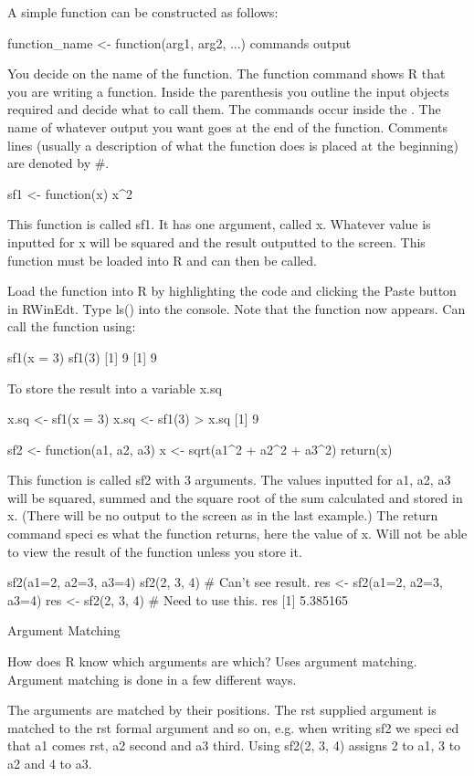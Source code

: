 A simple function can be constructed as follows:

 
function_name <- function(arg1, arg2, ...){
commands
output
}

 
You decide on the name of the function.
The function command shows R that you are writing a function.
Inside the parenthesis you outline the input objects required and decide what to call them.
The commands occur inside the { }.
The name of whatever output you want goes at the end of the function.
Comments lines (usually a description of what the function does is placed at the beginning) are denoted by #.
 


sf1 <- function(x){
x^2
}


This function is called sf1. It has one argument, called x. Whatever value is inputted for x will be squared and the result outputted to the screen. This function must be loaded into R and can then be called.

 
Load the function into R by highlighting the code and clicking the Paste button in RWinEdt.
Type ls() into the console. Note that the function now appears. Can call the function using:
 


sf1(x = 3) sf1(3)
[1] 9 [1] 9



 
To store the result into a variable x.sq



x.sq <- sf1(x = 3) x.sq <- sf1(3)
> x.sq
[1] 9
 
sf2 <- function(a1, a2, a3){
x <- sqrt(a1^2 + a2^2 + a3^2)
return(x)
}



 
This function is called sf2 with 3 arguments. The values inputted for a1, a2, a3 will be squared, summed and the square root of the sum calculated and stored in x. (There will be no output to the screen as in the last example.) The return command speci es what the function returns, here the value of x. Will not be able to view the result of the function unless you store it.
 
sf2(a1=2, a2=3, a3=4) sf2(2, 3, 4) # Can't see result.
res <- sf2(a1=2, a2=3, a3=4) res <- sf2(2, 3, 4) # Need to use this.
res
[1] 5.385165
 
Argument Matching
 
How does R know which arguments are which? Uses argument matching.  Argument matching is done in a few different ways.
 
The arguments are matched by their positions. The rst supplied argument is matched to the rst formal argument and so on, e.g. when writing sf2 we speci ed that a1 comes rst, a2 second and a3 third. Using sf2(2, 3, 4) assigns 2 to a1, 3 to a2 and 4 to a3.
 
